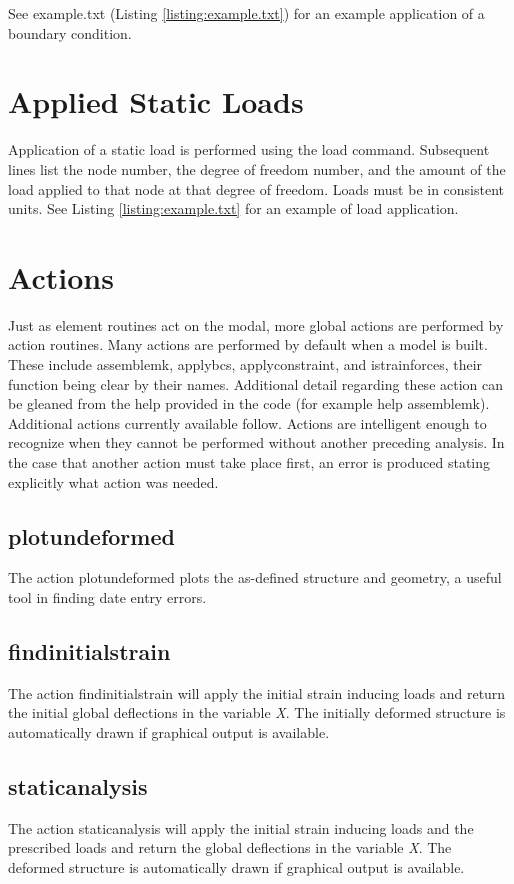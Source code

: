 \documentclass[12pt]{article}
\newcommand*{\command}[1]{\textsf{#1}}
\newcommand*{\variable}[1]{\textit{#1}}
\begin{document}
See example.txt (Listing \ref{listing:example.txt}) for an example
application of a boundary condition.

\section{Applied Static Loads}\label{staticloads}
Application of a static load is performed using the \command{load}
command. Subsequent lines list the node number, the degree of freedom
number, and the amount of the load applied to that node at that degree
of freedom. Loads must be in consistent units.  See Listing
\ref{listing:example.txt} for an example of load application.
\section{Actions}\label{sec:actions}
Just as element routines act on the modal, more global actions are performed by action routines. Many actions are performed by default when a model is built. These include \command{assemblemk}, \command{applybcs}, \command{applyconstraint}, and \command{istrainforces}, their function being clear by their names. Additional detail regarding these action can be gleaned from the help provided in the code (for example \command{help assemblemk}). Additional actions currently available follow. Actions are intelligent enough to recognize when they cannot be performed without another preceding analysis. In the case that another action must take place first, an error is produced stating explicitly what action was needed. 
\subsection{plotundeformed}
The action \command{plotundeformed} plots the as-defined structure and geometry, a useful tool in finding date entry errors. 
\subsection{findinitialstrain}
The action \command{findinitialstrain} will apply the initial strain inducing loads and return the initial global deflections in the variable \variable{X}. The initially deformed structure is automatically drawn if graphical output is available. 
\subsection{staticanalysis}
The action \command{staticanalysis} will apply the initial strain inducing loads and the prescribed loads and return the global deflections in the variable \variable{X}. The deformed structure is automatically drawn if graphical output is available. 
\end{document}

